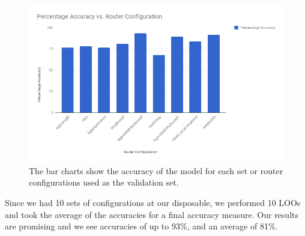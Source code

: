 \begin{figure}[H]
	\centering
	\includegraphics[width=\textwidth]{model_analysis.png}
	\caption{The bar charts show the accuracy of the model for each set or router configurations used as the validation set.}
\end{figure}
Since we had 10 sets of configurations at our disposable, we performed 10 LOOs and took the average of the accuracies for a final accuracy measure. Our results are promising and we see accuracies of up to 93\%, and an average of 81\%.